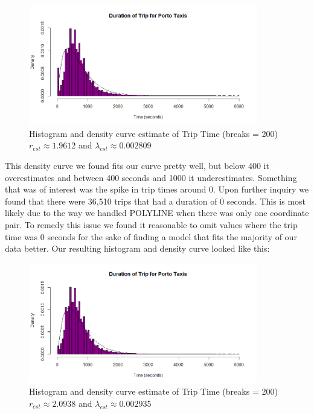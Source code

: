 \documentclass[letterpaper, 12 pt, conference]{article}
\begin{document}
\begin{enumerate}
    \\\\
    \begin{figure}[H]
    \centering
    \includegraphics[width=10cm]{B1HistoCurve2.png}
    \caption{Histogram and density curve estimate of Trip Time (breaks = 200) $r_{est} \approx 1.9612$ and $\lambda_{est} \approx 0.002809$ }
    \label{fig:b1histo1}
    \end{figure}
    
    This density curve we found fits our curve pretty well, but below 400 it overestimates and between 400 seconds and 1000 it underestimates. Something that was of interest was the spike in trip times around 0. Upon further inquiry we found that there were 36,510 trips that had a duration of 0 seconds. This is most likely due to the way we handled POLYLINE when there was only one coordinate pair. To remedy this issue we found it reasonable to omit values where the trip time was 0 seconds for the sake of finding a model that fits the majority of our data better. Our resulting histogram and density curve looked like this: 
    
    \begin{figure}[H]
    \centering
    \includegraphics[width=10cm]{B1HistoCurve3.png}
    \caption{Histogram and density curve estimate of Trip Time (breaks = 200) $r_{est} \approx 2.0938$ and $\lambda_{est} \approx 0.002935$ }
    \label{fig:b1histo1}
    \end{figure}
    

\end{enumerate}
\end{document}
